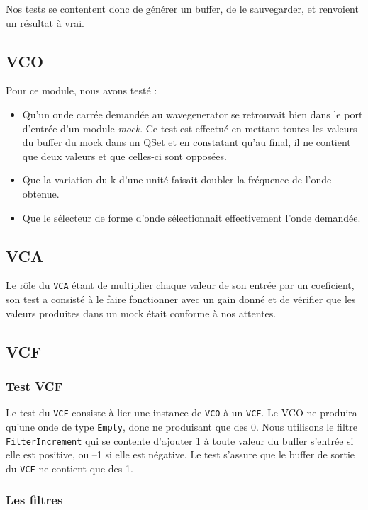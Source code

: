 Nos tests se contentent donc de générer un buffer, de le
sauvegarder, et renvoient un résultat à vrai.

\subsection{VCO}
Pour ce module, nous avons testé :
\begin{itemize}
    \item Qu'un onde  carrée demandée au wavegenerator se retrouvait bien dans le port d'entrée d'un module \textit{mock}. Ce test est effectué en mettant toutes les valeurs du buffer du mock dans un QSet et en constatant qu'au final, il ne contient que deux valeurs et que celles-ci sont opposées.
    \item Que la variation du k d'une unité faisait doubler la fréquence de l'onde obtenue.
    \item Que le sélecteur de forme d'onde sélectionnait effectivement l'onde demandée.
\end{itemize}

\subsection{VCA}
Le rôle du \verb!VCA! étant de multiplier chaque valeur de son entrée par un coeficient, son test a consisté à le faire fonctionner avec un gain donné et de vérifier que les valeurs produites dans un mock était conforme à nos attentes.

\subsection{VCF}

\subsubsection{Test VCF}

Le test du \verb!VCF! consiste à lier une instance de \verb!VCO! à
un \verb!VCF!. Le VCO ne produira qu'une onde de type \verb!Empty!,
donc ne produisant que des 0. Nous utilisons le filtre
\verb!FilterIncrement! qui se contente d'ajouter 1 à toute valeur
du buffer s'entrée si elle est positive, ou --1 si elle est
négative. Le test s'assure que le buffer de sortie du \verb!VCF! ne
contient que des 1.

\subsubsection{Les filtres}

